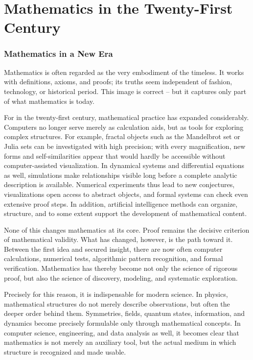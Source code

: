 \chapter{Mathematics in the Twenty-First Century}
\label{chap:IX_21st_century}


\subsection{Mathematics in a New Era}

Mathematics is often regarded as the very embodiment of the timeless.
It works with definitions, axioms, and proofs;
its truths seem independent of fashion, technology, or historical period.
This image is correct -- but it captures only part of what mathematics is today.

For in the twenty-first century, mathematical practice has expanded considerably.
Computers no longer serve merely as calculation aids,
but as tools for exploring complex structures.
For example, fractal objects such as the Mandelbrot set or Julia sets
can be investigated with high precision;
with every magnification, new forms and self-similarities appear
that would hardly be accessible without computer-assisted visualization.
In dynamical systems and differential equations as well,
simulations make relationships visible
long before a complete analytic description is available.
Numerical experiments thus lead to new conjectures,
visualizations open access to abstract objects,
and formal systems can check even extensive proof steps.
In addition, artificial intelligence methods can organize,
structure, and to some extent support the development of mathematical content.

None of this changes mathematics at its core.
Proof remains the decisive criterion of mathematical validity.
What has changed, however, is the path toward it.
Between the first idea and secured insight,
there are now often computer calculations,
numerical tests,
algorithmic pattern recognition,
and formal verification.
Mathematics has thereby become not only the science of rigorous proof,
but also the science of discovery,
modeling,
and systematic exploration.

Precisely for this reason, it is indispensable for modern science.
In physics, mathematical structures do not merely describe observations,
but often the deeper order behind them.
Symmetries, fields, quantum states, information, and dynamics
become precisely formulable only through mathematical concepts.
In computer science, engineering, and data analysis as well,
it becomes clear that mathematics is not merely an auxiliary tool,
but the actual medium
in which structure is recognized and made usable.

